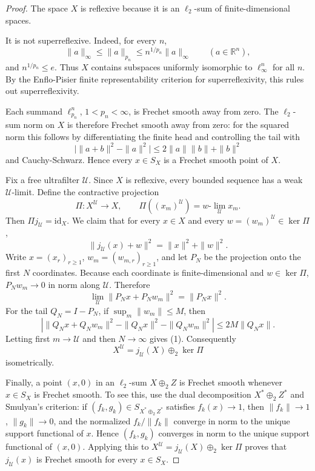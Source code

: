 \documentclass[11pt]{article}
\newcommand{\U}{\mathcal U}
\begin{document}
\begin{proof}
The space \(X\) is reflexive because it is an \(\ell_2\)-sum of
finite-dimensional spaces.

It is not superreflexive.  Indeed, for every \(n\),
\[
  \|a\|_\infty \leq \|a\|_{p_n}\leq n^{1/p_n}\|a\|_\infty
  \qquad(a\in\mathbb R^n),
\]
and \(n^{1/p_n}\leq e\).  Thus \(X\) contains subspaces uniformly isomorphic
to \(\ell_\infty^n\) for all \(n\).  By the Enflo-Pisier finite
representability criterion for superreflexivity, this rules out
superreflexivity.

Each summand \(\ell_{p_n}^n\), \(1<p_n<\infty\), is Frechet smooth away from
zero.  The \(\ell_2\)-sum norm on \(X\) is therefore Frechet smooth away from
zero: for the squared norm this follows by differentiating the finite head and
controlling the tail with
\[
  \bigl|\|a+b\|^2-\|a\|^2\bigr|\leq 2\|a\|\|b\|+\|b\|^2
\]
and Cauchy-Schwarz.  Hence every \(x\in S_X\) is a Frechet smooth point of
\(X\).

Fix a free ultrafilter \(\U\).  Since \(X\) is reflexive, every bounded
sequence has a weak \(\U\)-limit.  Define the contractive projection
\[
  \Pi:X^\U\to X,\qquad
  \Pi((x_m)^\U)=w\text{-}\lim_{\U} x_m .
\]
Then \(\Pi j_\U=\mathrm{id}_X\).  We claim that for every \(x\in X\) and every
\(w=(w_m)^\U\in\ker\Pi\),
\[
  \|j_\U(x)+w\|^2=\|x\|^2+\|w\|^2. \tag{1}
\]
Write \(x=(x_r)_{r\geq1}\), \(w_m=(w_{m,r})_{r\geq1}\), and let \(P_N\) be
the projection onto the first \(N\) coordinates.  Because each coordinate is
finite-dimensional and \(w\in\ker\Pi\), \(P_Nw_m\to0\) in norm along \(\U\).
Therefore
\[
  \lim_\U \|P_Nx+P_Nw_m\|^2=\|P_Nx\|^2 .
\]
For the tail \(Q_N=I-P_N\), if \(\sup_m\|w_m\|\leq M\), then
\[
 \left|
 \|Q_Nx+Q_Nw_m\|^2-\|Q_Nx\|^2-\|Q_Nw_m\|^2
 \right|
 \leq 2M\|Q_Nx\|.
\]
Letting first \(m\to\U\) and then \(N\to\infty\) gives (1).  Consequently
\[
  X^\U = j_\U(X)\oplus_2\ker\Pi
\]
isometrically.

Finally, a point \((x,0)\) in an \(\ell_2\)-sum \(X\oplus_2 Z\) is Frechet
smooth whenever \(x\in S_X\) is Frechet smooth.  To see this, use the dual
decomposition \(X^*\oplus_2 Z^*\) and Smulyan's criterion: if
\((f_k,g_k)\in S_{X^*\oplus_2 Z^*}\) satisfies \(f_k(x)\to1\), then
\(\|f_k\|\to1\), \(\|g_k\|\to0\), and the normalized \(f_k/\|f_k\|\) converge
in norm to the unique support functional of \(x\).  Hence
\((f_k,g_k)\) converges in norm to the unique support functional of \((x,0)\).
Applying this to \(X^\U=j_\U(X)\oplus_2\ker\Pi\) proves that \(j_\U(x)\) is
Frechet smooth for every \(x\in S_X\).
\end{proof}
\end{document}
